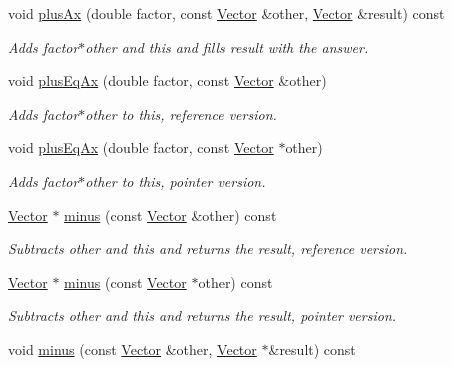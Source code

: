 \begin{DoxyCompactItemize}
void \hyperlink{class_c_a_r_o_m_1_1_vector_adf5cf651dca4c3a4d2cc9938eda314d8}{plus\-Ax} (double factor, const \hyperlink{class_c_a_r_o_m_1_1_vector}{Vector} \&other, \hyperlink{class_c_a_r_o_m_1_1_vector}{Vector} \&result) const 
\begin{DoxyCompactList}\small\item\em Adds factor$\ast$other and this and fills result with the answer. \end{DoxyCompactList}\item 
void \hyperlink{class_c_a_r_o_m_1_1_vector_aae3ef84fdd8263704316175f681f25d1}{plus\-Eq\-Ax} (double factor, const \hyperlink{class_c_a_r_o_m_1_1_vector}{Vector} \&other)
\begin{DoxyCompactList}\small\item\em Adds factor$\ast$other to this, reference version. \end{DoxyCompactList}\item 
void \hyperlink{class_c_a_r_o_m_1_1_vector_a5c766f8f3ebdf13e9b90ddfd106c73e6}{plus\-Eq\-Ax} (double factor, const \hyperlink{class_c_a_r_o_m_1_1_vector}{Vector} $\ast$other)
\begin{DoxyCompactList}\small\item\em Adds factor$\ast$other to this, pointer version. \end{DoxyCompactList}\item 
\hyperlink{class_c_a_r_o_m_1_1_vector}{Vector} $\ast$ \hyperlink{class_c_a_r_o_m_1_1_vector_ac7e6bd13bfb89ae084f1933789055999}{minus} (const \hyperlink{class_c_a_r_o_m_1_1_vector}{Vector} \&other) const 
\begin{DoxyCompactList}\small\item\em Subtracts other and this and returns the result, reference version. \end{DoxyCompactList}\item 
\hyperlink{class_c_a_r_o_m_1_1_vector}{Vector} $\ast$ \hyperlink{class_c_a_r_o_m_1_1_vector_a8fdd8bfd9524c1c0084ea4572f8aeeb9}{minus} (const \hyperlink{class_c_a_r_o_m_1_1_vector}{Vector} $\ast$other) const 
\begin{DoxyCompactList}\small\item\em Subtracts other and this and returns the result, pointer version. \end{DoxyCompactList}\item 
void \hyperlink{class_c_a_r_o_m_1_1_vector_a00a8433af7256afbb9aa31b18a34b9fa}{minus} (const \hyperlink{class_c_a_r_o_m_1_1_vector}{Vector} \&other, \hyperlink{class_c_a_r_o_m_1_1_vector}{Vector} $\ast$\&result) const 

\end{DoxyCompactItemize}
